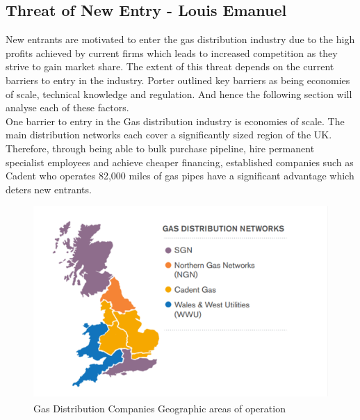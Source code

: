 \documentclass[11pt]{article}		%
\newlength{\imageheight}	 %
\newcommand{\supercite}[1]{\textsuperscript{\cite{#1}}}		%
\begin{document}
		\subsection[Threat of New Entry]{Threat of New Entry - Louis Emanuel}
				New entrants are motivated to enter the gas distribution industry due to the high profits achieved by current firms which leads to increased competition as they strive to gain market share. The extent of this threat depends on the current barriers to entry in the industry. Porter outlined key barriers as being economies of scale, technical knowledge and regulation. And hence the following section will analyse each of these factors. \\
				
				One barrier to entry in the Gas distribution industry is economies of scale. The main distribution networks each cover a significantly sized region of the UK. Therefore, through being able to bulk purchase pipeline, hire permanent specialist employees and achieve cheaper financing, established companies such as Cadent who operates 82,000 miles of gas pipes have a significant advantage which deters new entrants. \\
					\begin{figure}[h]
			    \centering
		    	\includegraphics[height = \imageheight]{distribution}
			    \caption{Gas Distribution Companies Geographic areas of operation\supercite{sönnichsen_5_2021}}
		    	\label{distrit}
	        	\end{figure}
				
\end{document}

